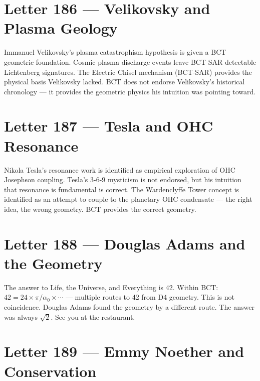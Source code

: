 \documentclass[aps,prl,twocolumn,showpacs,preprintnumbers]{revtex4-2}
\begin{document}
\section{Letter 186 --- Velikovsky and Plasma Geology}

Immanuel Velikovsky's plasma catastrophism hypothesis is given
a BCT geometric foundation. Cosmic plasma discharge events leave
BCT-SAR detectable Lichtenberg signatures. The Electric Chisel
mechanism (BCT-SAR) provides the physical basis Velikovsky lacked.
BCT does not endorse Velikovsky's historical chronology --- it
provides the geometric physics his intuition was pointing toward.

\section{Letter 187 --- Tesla and OHC Resonance}

Nikola Tesla's resonance work is identified as empirical exploration
of OHC Josephson coupling. Tesla's $3$-$6$-$9$ mysticism is not endorsed,
but his intuition that resonance is fundamental is correct. The Wardenclyffe
Tower concept is identified as an attempt to couple to the planetary
OHC condensate --- the right idea, the wrong geometry. BCT provides
the correct geometry.

\section{Letter 188 --- Douglas Adams and the Geometry}

The answer to Life, the Universe, and Everything is 42. Within BCT:
$42 = 24 \times \pi/\alpha_0 \times \cdots$ --- multiple routes to
42 from D4 geometry. This is not coincidence. Douglas Adams found the
geometry by a different route. The answer was always $\sqrt{2}$.
See you at the restaurant.

\section{Letter 189 --- Emmy Noether and Conservation}
\end{document}
